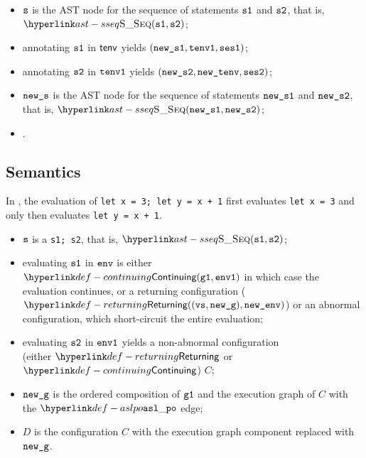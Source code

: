 \ProseParagraph
\AllApply
\begin{itemize}
  \item $\vs$ is the AST node for the sequence of statements $\vsone$ and $\vstwo$, that is, $\SSeq(\vsone, \vstwo)$;
  \item annotating $\vsone$ in $\tenv$ yields $(\newsone, \tenvone, \vsesone)$\ProseOrTypeError;
  \item annotating $\vstwo$ in $\tenvone$ yields $(\newstwo, \newtenv, \vsestwo)$\ProseOrTypeError;
  \item $\news$ is the AST node for the sequence of statements $\newsone$ and $\newstwo$, that is, $\SSeq(\newsone, \newstwo)$;
  \item {}.
\end{itemize}
\FormallyParagraph
\begin{mathpar}
\end{mathpar}

\subsection{Semantics}
In ,
the evaluation of \texttt{let x = 3; let y = x + 1} first evaluates \texttt{let x = 3} and only then
evaluates \texttt{let y = x + 1}.

\ProseParagraph
\AllApply
\begin{itemize}
  \item $\vs$ is a \sequencingstatementterm{} \texttt{s1; s2}, that is, $\SSeq(\vsone, \vstwo)$;
  \item evaluating $\vsone$ in $\env$ is either $\Continuing(\vgone, \envone)$ in which case
        the evaluation continues,
        or a returning configuration ($\Returning((\vvs, \newg), \newenv)$)
        or an abnormal configuration, which short-circuit the entire evaluation;
  \item evaluating $\vstwo$ in $\envone$ yields a non-abnormal configuration \\
        (either $\Returning$ or $\Continuing$) $C$\ProseOrAbnormal;
  \item $\newg$ is the ordered composition of $\vgone$ and the execution graph of $C$ with the
        $\aslpo$ edge;
  \item $D$ is the configuration $C$ with the execution graph component replaced with $\newg$.
\end{itemize}

